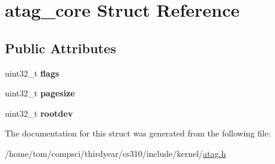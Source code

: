 \hypertarget{structatag__core}{}\section{atag\+\_\+core Struct Reference}
\label{structatag__core}
\subsection*{Public Attributes}
\begin{DoxyCompactItemize}
\item 
\mbox{\label{structatag__core_a7d5f0344e0e4844944dd4527ab9fc75f}} 
uint32\+\_\+t {\bfseries flags}
\item 
\mbox{\label{structatag__core_a5ef7dfb70be16da0ba7e17e859bf9008}} 
uint32\+\_\+t {\bfseries pagesize}
\item 
\mbox{\label{structatag__core_a5a0a4043c12467184ddaa00ecb8d1917}} 
uint32\+\_\+t {\bfseries rootdev}
\end{DoxyCompactItemize}


The documentation for this struct was generated from the following file\+:\begin{DoxyCompactItemize}
\item 
/home/tom/compsci/thirdyear/cs310/include/kernel/\mbox{\hyperlink{atag_8h}{atag.\+h}}\end{DoxyCompactItemize}
